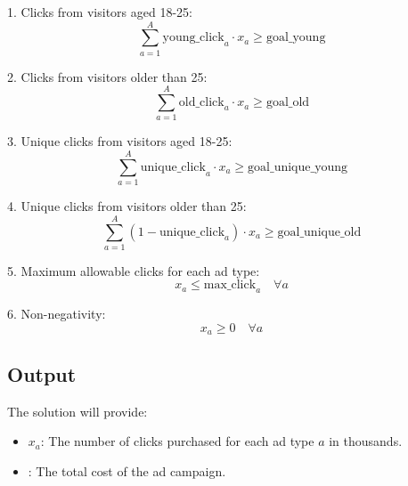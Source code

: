 \documentclass{article}
\begin{document}
1. Clicks from visitors aged 18-25:
\[
\sum_{a=1}^{A} \text{young\_click}_a \cdot x_a \geq \text{goal\_young}
\]

2. Clicks from visitors older than 25:
\[
\sum_{a=1}^{A} \text{old\_click}_a \cdot x_a \geq \text{goal\_old}
\]

3. Unique clicks from visitors aged 18-25:
\[
\sum_{a=1}^{A} \text{unique\_click}_a \cdot x_a \geq \text{goal\_unique\_young}
\]

4. Unique clicks from visitors older than 25:
\[
\sum_{a=1}^{A} (1 - \text{unique\_click}_a) \cdot x_a \geq \text{goal\_unique\_old}
\]

5. Maximum allowable clicks for each ad type:
\[
x_a \leq \text{max\_click}_a \quad \forall a
\]

6. Non-negativity:
\[
x_a \geq 0 \quad \forall a
\]

\subsection*{Output}
The solution will provide:
\begin{itemize}
    \item \( x_a \): The number of clicks purchased for each ad type \( a \) in thousands.
    \item {}: The total cost of the ad campaign.
\end{itemize}
\end{document}
